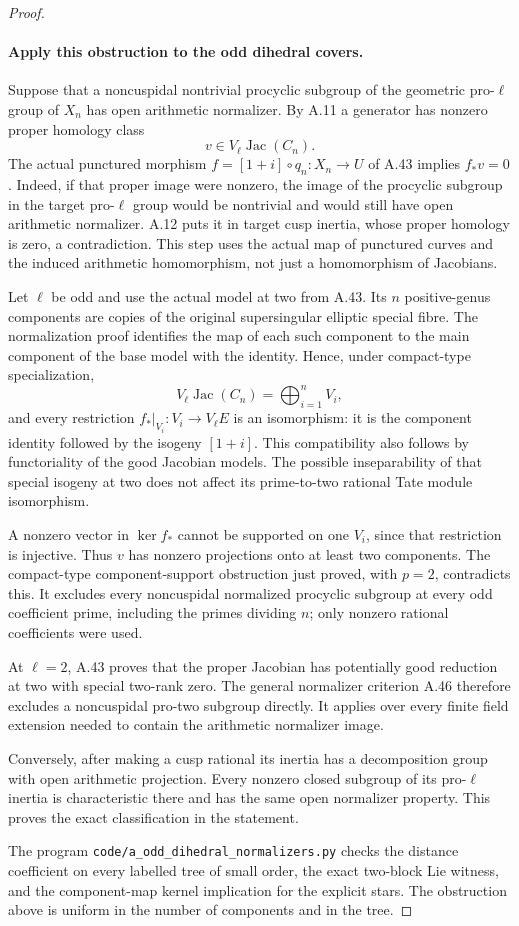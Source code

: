 \begin{proof}
\paragraph{Apply this obstruction to the odd dihedral covers.}
Suppose that a noncuspidal nontrivial procyclic subgroup
of the geometric pro-\(\ell\) group of \(X_n\)
has open arithmetic normalizer. By A.11 a generator
has nonzero proper homology class
\[
                         v\in V_\ell\operatorname{Jac}(C_n).
\]
The actual punctured morphism
\(f=[1+i]\circ q_n:X_n\to U\) of A.43 implies
\(f_*v=0\). Indeed, if that proper image were
nonzero, the image of the procyclic subgroup in the
target pro-\(\ell\) group would be nontrivial and
would still have open arithmetic normalizer. A.12
puts it in target cusp inertia, whose proper homology
is zero, a contradiction. This step uses the actual
map of punctured curves and the induced arithmetic
homomorphism, not just a homomorphism of Jacobians.

Let \(\ell\) be odd and use the actual model at
two from A.43. Its \(n\) positive-genus components
are copies of the original supersingular elliptic
special fibre. The normalization proof identifies
the map of each such component to the main component
of the base model with the identity. Hence, under
compact-type specialization,
\[
             V_\ell\operatorname{Jac}(C_n)
                         =\bigoplus_{i=1}^n V_i,
\]
and every restriction
\(f_*|_{V_i}:V_i\to V_\ell E\) is an isomorphism:
it is the component identity followed by the
isogeny \([1+i]\). This compatibility also follows
by functoriality of the good Jacobian models. The
possible inseparability of that special isogeny at
two does not affect its prime-to-two rational Tate
module isomorphism.

A nonzero vector in \(\ker f_*\) cannot be
supported on one \(V_i\), since that restriction
is injective. Thus \(v\) has nonzero projections
onto at least two components. The compact-type
component-support obstruction just proved, with
\(p=2\), contradicts this. It excludes every
noncuspidal normalized procyclic subgroup at every
odd coefficient prime, including the primes dividing
\(n\); only nonzero rational coefficients were used.

At \(\ell=2\), A.43 proves that the proper Jacobian
has potentially good reduction at two with special
two-rank zero. The general normalizer criterion
A.46 therefore excludes a noncuspidal pro-two
subgroup directly. It applies over every finite
field extension needed to contain the arithmetic
normalizer image.

Conversely, after making a cusp rational its inertia
has a decomposition group with open arithmetic
projection. Every nonzero closed subgroup of its
pro-\(\ell\) inertia is characteristic there and
has the same open normalizer property. This proves
the exact classification in the statement.

The program \texttt{code/a\_odd\_dihedral\_normalizers.py}
checks the distance coefficient on every labelled
tree of small order, the exact two-block Lie witness,
and the component-map kernel implication for the
explicit stars. The obstruction above is uniform
in the number of components and in the tree.
\end{proof}
